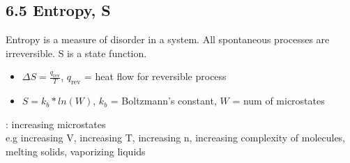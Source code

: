 \subsection{6.5 Entropy, S}
    Entropy is a measure of disorder in a system. All spontaneous processes are irreversible. S is a state function.
    \begin{itemize}
        \item $\Delta S = \frac{q_\text{rev}}{T}$, $q_\text{rev}$ = heat flow for reversible process
        \item $S = k_b*ln(W)$, $k_b$ = Boltzmann's constant, $W$ = num of microstates
    \end{itemize}
    : increasing microstates\\
    e.g increasing V, increasing T, increasing n, increasing complexity of molecules, melting solids, vaporizing liquids